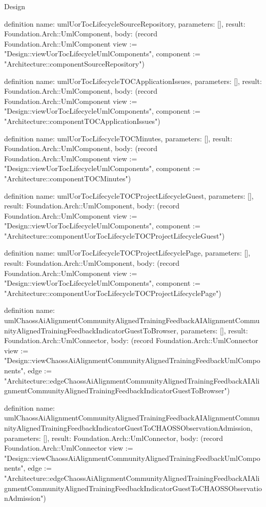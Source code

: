 \begin{lexlean}{Design}
\begin{semanticmodule}
definition{
  name: umlUorTocLifecycleSourceRepository,
  parameters: [],
  result: Foundation.Arch::UmlComponent,
  body: (record Foundation.Arch::UmlComponent {view := "Design::viewUorTocLifecycleUmlComponents", component := "Architecture::componentSourceRepository"})
}

definition{
  name: umlUorTocLifecycleTOCApplicationIssues,
  parameters: [],
  result: Foundation.Arch::UmlComponent,
  body: (record Foundation.Arch::UmlComponent {view := "Design::viewUorTocLifecycleUmlComponents", component := "Architecture::componentTOCApplicationIssues"})
}

definition{
  name: umlUorTocLifecycleTOCMinutes,
  parameters: [],
  result: Foundation.Arch::UmlComponent,
  body: (record Foundation.Arch::UmlComponent {view := "Design::viewUorTocLifecycleUmlComponents", component := "Architecture::componentTOCMinutes"})
}

definition{
  name: umlUorTocLifecycleTOCProjectLifecycleGuest,
  parameters: [],
  result: Foundation.Arch::UmlComponent,
  body: (record Foundation.Arch::UmlComponent {view := "Design::viewUorTocLifecycleUmlComponents", component := "Architecture::componentUorTocLifecycleTOCProjectLifecycleGuest"})
}

definition{
  name: umlUorTocLifecycleTOCProjectLifecyclePage,
  parameters: [],
  result: Foundation.Arch::UmlComponent,
  body: (record Foundation.Arch::UmlComponent {view := "Design::viewUorTocLifecycleUmlComponents", component := "Architecture::componentUorTocLifecycleTOCProjectLifecyclePage"})
}

definition{
  name: umlChaossAiAlignmentCommunityAlignedTrainingFeedbackAIAlignmentCommunityAlignedTrainingFeedbackIndicatorGuestToBrowser,
  parameters: [],
  result: Foundation.Arch::UmlConnector,
  body: (record Foundation.Arch::UmlConnector {view := "Design::viewChaossAiAlignmentCommunityAlignedTrainingFeedbackUmlComponents", edge := "Architecture::edgeChaossAiAlignmentCommunityAlignedTrainingFeedbackAIAlignmentCommunityAlignedTrainingFeedbackIndicatorGuestToBrowser"})
}

definition{
  name: umlChaossAiAlignmentCommunityAlignedTrainingFeedbackAIAlignmentCommunityAlignedTrainingFeedbackIndicatorGuestToCHAOSSObservationAdmission,
  parameters: [],
  result: Foundation.Arch::UmlConnector,
  body: (record Foundation.Arch::UmlConnector {view := "Design::viewChaossAiAlignmentCommunityAlignedTrainingFeedbackUmlComponents", edge := "Architecture::edgeChaossAiAlignmentCommunityAlignedTrainingFeedbackAIAlignmentCommunityAlignedTrainingFeedbackIndicatorGuestToCHAOSSObservationAdmission"})
}


\end{semanticmodule}
\end{lexlean}
